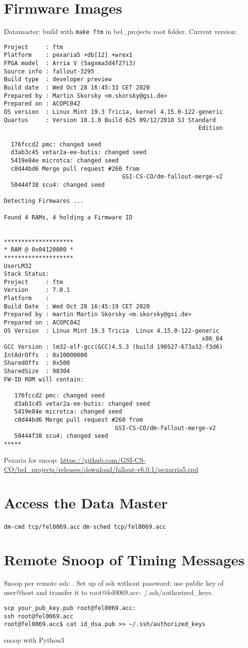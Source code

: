 \documentclass[12pt,a4paper]{report}
\begin{document}
\section{Firmware Images}
Datamaster: build with \texttt{make ftm} in bel\_projects root folder. Current version:
\begin{verbatim}
Project     : ftm
Platform    : pexaria5 +db[12] +wrex1
FPGA model  : Arria V (5agxma3d4f27i3)
Source info : fallout-3295
Build type  : developer preview
Build date  : Wed Oct 28 16:45:33 CET 2020
Prepared by : Martin Skorsky <m.skorsky@gsi.de>
Prepared on : ACOPC042
OS version  : Linux Mint 19.3 Tricia, kernel 4.15.0-122-generic
Quartus     : Version 18.1.0 Build 625 09/12/2018 SJ Standard
                                                        Edition

  176fccd2 pmc: changed seed
  d3ab3c45 vetar2a-ee-butis: changed seed
  5419e84e microtca: changed seed
  c0d44bd6 Merge pull request #260 from
                                  GSI-CS-CO/dm-fallout-merge-v2
  50444f38 scu4: changed seed

Detecting Firmwares ...

Found 4 RAMs, 4 holding a Firmware ID


********************
* RAM @ 0x04120000 *
********************
UserLM32
Stack Status:
Project     : ftm
Version     : 7.0.1
Platform    :
Build Date  : Wed Oct 28 16:45:19 CET 2020
Prepared by : martin Martin Skorsky <m.skorsky@gsi.de>
Prepared on : ACOPC042
OS Version  : Linux Mint 19.3 Tricia  Linux 4.15.0-122-generic
                                                         x86_64
GCC Version : lm32-elf-gcc(GCC)4.5.3 (build 190527-673a32-f3d6)
IntAdrOffs  : 0x10000000
SharedOffs  : 0x500
SharedSize  : 98304
FW-ID ROM will contain:

   176fccd2 pmc: changed seed
   d3ab3c45 vetar2a-ee-butis: changed seed
   5419e84e microtca: changed seed
   c0d44bd6 Merge pull request #260 from
                                GSI-CS-CO/dm-fallout-merge-v2
   50444f38 scu4: changed seed
*****
\end{verbatim}

Pexaria for snoop: \url{https://github.com/GSI-CS-CO/bel\_projects/releases/download/fallout-v6.0.1/pexarria5.rpd}

\section{Access the Data Master}
\texttt{dm-cmd tcp/fel0069.acc}
\linebreak
\texttt{dm-sched tcp/fel0069.acc}

\section{Remote Snoop of Timing Messages}
Snoop per remote ssh: \texttt{}. Set up of ssh without password: use public key of user@host and transfer it to root@fel0069.acc:~/.ssh/authorized\_keys.
\begin{verbatim}
scp your_pub_key.pub root@fel0069.acc:
ssh root@fel0069.acc
root@fel0069.acc$ cat id_dsa.pub >> ~/.ssh/authorized_keys
\end{verbatim}
snoop with Python3
\end{document}
